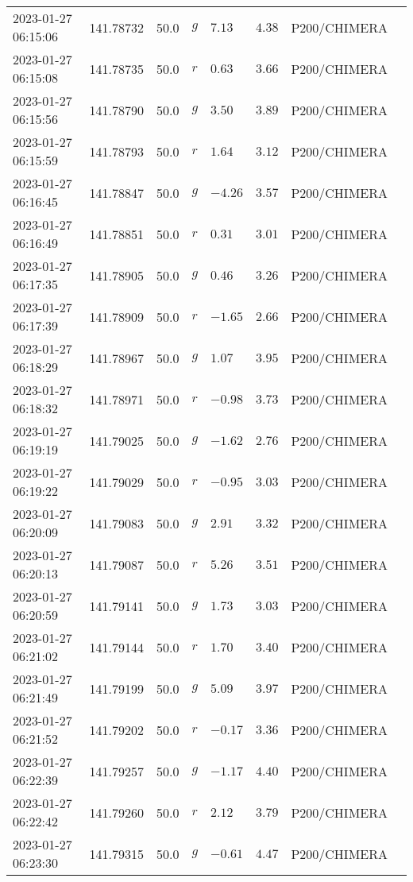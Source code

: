 \documentclass{nature_plusfigure}
\begin{document}
\begin{supplement}
\begin{center}
\begin{longtable}{llllllll}
2023-01-27 06:15:06 & 141.78732 & 50.0 & $g$ & $7.13$ & $4.38$ & P200/CHIMERA &  \\ 
2023-01-27 06:15:08 & 141.78735 & 50.0 & $r$ & $0.63$ & $3.66$ & P200/CHIMERA &  \\ 
2023-01-27 06:15:56 & 141.78790 & 50.0 & $g$ & $3.50$ & $3.89$ & P200/CHIMERA &  \\ 
2023-01-27 06:15:59 & 141.78793 & 50.0 & $r$ & $1.64$ & $3.12$ & P200/CHIMERA &  \\ 
2023-01-27 06:16:45 & 141.78847 & 50.0 & $g$ & $-4.26$ & $3.57$ & P200/CHIMERA &  \\ 
2023-01-27 06:16:49 & 141.78851 & 50.0 & $r$ & $0.31$ & $3.01$ & P200/CHIMERA &  \\ 
2023-01-27 06:17:35 & 141.78905 & 50.0 & $g$ & $0.46$ & $3.26$ & P200/CHIMERA &  \\ 
2023-01-27 06:17:39 & 141.78909 & 50.0 & $r$ & $-1.65$ & $2.66$ & P200/CHIMERA &  \\ 
2023-01-27 06:18:29 & 141.78967 & 50.0 & $g$ & $1.07$ & $3.95$ & P200/CHIMERA &  \\ 
2023-01-27 06:18:32 & 141.78971 & 50.0 & $r$ & $-0.98$ & $3.73$ & P200/CHIMERA &  \\ 
2023-01-27 06:19:19 & 141.79025 & 50.0 & $g$ & $-1.62$ & $2.76$ & P200/CHIMERA &  \\ 
2023-01-27 06:19:22 & 141.79029 & 50.0 & $r$ & $-0.95$ & $3.03$ & P200/CHIMERA &  \\ 
2023-01-27 06:20:09 & 141.79083 & 50.0 & $g$ & $2.91$ & $3.32$ & P200/CHIMERA &  \\ 
2023-01-27 06:20:13 & 141.79087 & 50.0 & $r$ & $5.26$ & $3.51$ & P200/CHIMERA &  \\ 
2023-01-27 06:20:59 & 141.79141 & 50.0 & $g$ & $1.73$ & $3.03$ & P200/CHIMERA &  \\ 
2023-01-27 06:21:02 & 141.79144 & 50.0 & $r$ & $1.70$ & $3.40$ & P200/CHIMERA &  \\ 
2023-01-27 06:21:49 & 141.79199 & 50.0 & $g$ & $5.09$ & $3.97$ & P200/CHIMERA &  \\ 
2023-01-27 06:21:52 & 141.79202 & 50.0 & $r$ & $-0.17$ & $3.36$ & P200/CHIMERA &  \\ 
2023-01-27 06:22:39 & 141.79257 & 50.0 & $g$ & $-1.17$ & $4.40$ & P200/CHIMERA &  \\ 
2023-01-27 06:22:42 & 141.79260 & 50.0 & $r$ & $2.12$ & $3.79$ & P200/CHIMERA &  \\ 
2023-01-27 06:23:30 & 141.79315 & 50.0 & $g$ & $-0.61$ & $4.47$ & P200/CHIMERA &  \\ 

\end{longtable}
\end{center}
\end{supplement}
\end{document}
